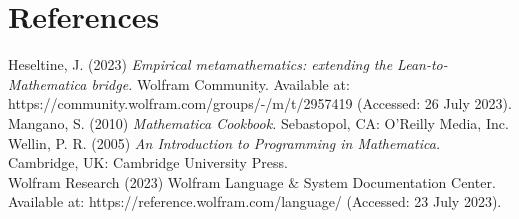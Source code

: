 \documentclass{article}
\begin{document}
\section*{References}

Heseltine, J. (2023) \textit{ Empirical metamathematics: extending the Lean-to-Mathematica bridge. }Wolfram Community. Available at: https://community.wolfram.com/groups/-/m/t/2957419
(Accessed: 26 July 2023).\\
Mangano, S. (2010) \textit{ Mathematica Cookbook. }Sebastopol, CA: O{'}Reilly Media, Inc.\\
Wellin, P. R. (2005) \textit{ An Introduction to Programming in Mathematica. }Cambridge, UK: Cambridge University Press.\\
Wolfram Research (2023) Wolfram Language $\&$ System Documentation Center. Available at: https://reference.wolfram.com/language/ (Accessed: 23 July
2023).
\end{document}
